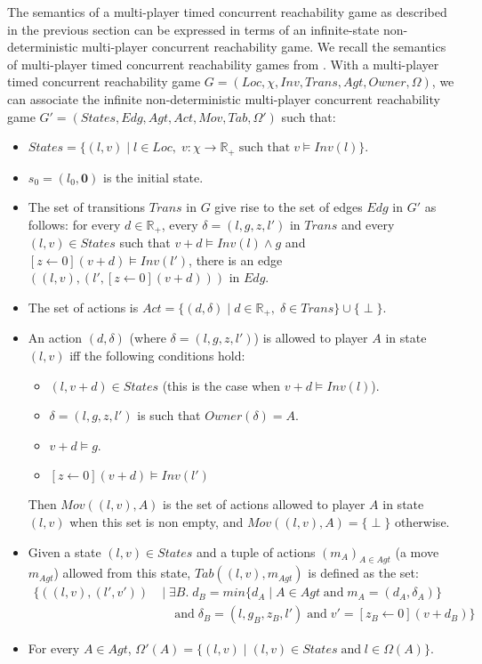 The semantics of a multi-player timed concurrent reachability game as described in the previous section can be expressed in terms of an infinite-state non-deterministic multi-player concurrent reachability game. We recall the semantics of multi-player timed concurrent reachability games from \cite{BBM-concur10,BBM-report}. With a multi-player timed  concurrent reachability game $G = (Loc, \chi, Inv, Trans, Agt, Owner, \Omega)$, we can associate the infinite non-deterministic multi-player concurrent reachability game $G' = (States, Edg, Agt, Act, Mov, Tab, \Omega')$ such that:
\begin{itemize}
\item $States = \lbrace (l,v) \; \vert \; l \in Loc, \; v: \chi \rightarrow \mathbb{R}_{+} \; \text{such that} \; v \models Inv(l) \rbrace$.
\item $s_{0} = (l_{0}, \textbf{0})$ is the initial state.
\item The set of transitions $Trans$ in $G$ give rise to the set of edges $Edg$ in $G'$ as follows: for every $d \in \mathbb{R}_{+}$, every $\delta = (l, g, z, l')$ in $Trans$ and every $(l, v) \in States$ such that $v + d \models Inv(l) \wedge g$ and $[z \leftarrow 0](v + d) \models Inv(l')$, there is an edge $((l, v), (l', [z \leftarrow 0](v + d)))$ in $Edg$.
\item The set of actions is $Act = \lbrace (d, \delta) \; \vert \; d \in \mathbb{R}_{+}, \; \delta \in Trans \rbrace \cup \lbrace \perp \rbrace$.
\item An action $(d, \delta)$ (where $\delta = (l, g, z, l')$) is allowed to player $A$ in state $(l, v)$ iff the following conditions hold:
\begin{itemize}
\item $(l, v + d) \in States$ (this is the case when $v + d \models Inv(l)$).
\item $\delta = (l, g, z, l')$ is such that $Owner(\delta) = A$.
\item $v + d \models g$.
\item $[z \leftarrow 0](v + d) \models Inv(l')$
\end{itemize}
Then $Mov((l, v), A)$ is the set of actions allowed to player $A$ in state $(l, v)$ when this set is non empty, and $Mov((l, v), A) = \lbrace \perp \rbrace$ otherwise.
\item Given a state $(l, v) \in States$ and a tuple of actions $(m_{A})_{A\in Agt}$ (a move $m_{Agt}$) allowed from this state, $Tab((l, v), m_{Agt})$ is defined as the set:
\begin{align*}
\Big\lbrace ((l, v), (l', v')) \; &\Big\vert \; \exists B. \; d_{B} = min\lbrace d_{A} \; \vert \; A \in Agt \; \text{and} \; m_{A} = (d_{A}, \delta_{A}) \rbrace\\
&\quad \text{and} \; \delta_{B} = (l, g_{B}, z_{B}, l') \; \text{and} \; v' = [z_{B} \leftarrow 0](v + d_{B}) \Big\rbrace
\end{align*}
\item  For every $A \in Agt$, $\Omega'(A) = \lbrace (l, v) \; \vert \; (l, v) \in States \; \text{and} \; l \in \Omega(A) \rbrace$.
\end{itemize}

